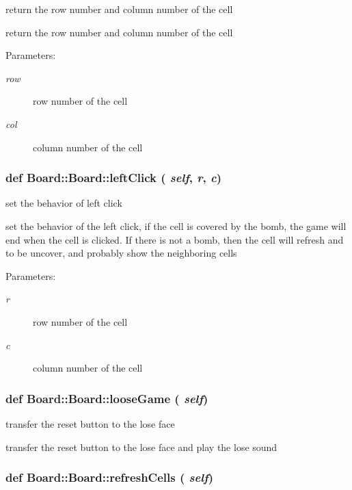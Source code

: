 return the row number and column number of the cell 

return the row number and column number of the cell \begin{Desc}
\item[Parameters:]
\begin{description}
\item[{\em row}]row number of the cell \item[{\em col}]column number of the cell \end{description}
\end{Desc}
\subsubsection{\setlength{\rightskip}{0pt plus 5cm}def Board::Board::left\-Click ( {\em self},  {\em r},  {\em c})}\label{classBoard_1_1Board_8c27d6981748af675b8804da78a94b0f}


set the behavior of left click 

set the behavior of the left click, if the cell is covered by the bomb, the game will end when the cell is clicked. If there is not a bomb, then the cell will refresh and to be uncover, and probably show the neighboring cells \begin{Desc}
\item[Parameters:]
\begin{description}
\item[{\em r}]row number of the cell \item[{\em c}]column number of the cell \end{description}
\end{Desc}
\subsubsection{\setlength{\rightskip}{0pt plus 5cm}def Board::Board::loose\-Game ( {\em self})}\label{classBoard_1_1Board_874d5ba8e85b3981cbb3eabcaf263192}


transfer the reset button to the lose face 

transfer the reset button to the lose face and play the lose sound 
\subsubsection{\setlength{\rightskip}{0pt plus 5cm}def Board::Board::refresh\-Cells ( {\em self})}\label{classBoard_1_1Board_2bebaed9281b5f95a3e0e164361e5041}


